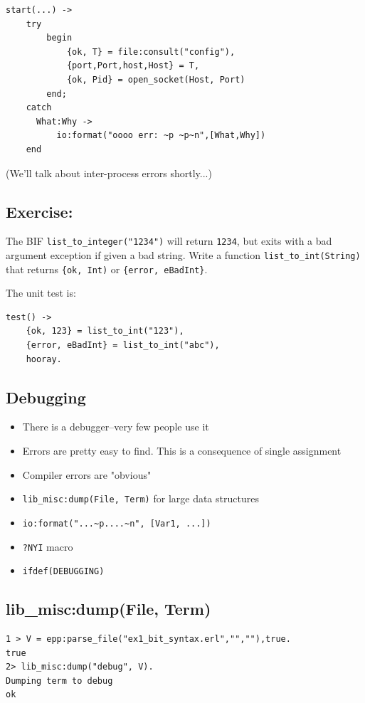 \documentclass[12pt]{article}
\begin{document}
\begin{verbatim}
start(...) ->
    try
        begin
            {ok, T} = file:consult("config"),
            {port,Port,host,Host} = T,
            {ok, Pid} = open_socket(Host, Port)
        end;
    catch
      What:Why ->
          io:format("oooo err: ~p ~p~n",[What,Why])
    end
\end{verbatim}

(We'll talk about inter-process errors shortly...)

\subsection{Exercise:}

The BIF \verb+list_to_integer("1234")+ will return \verb+1234+, but
exits with a bad argument exception if given a bad string. Write a
function \verb+list_to_int(String)+ that returns \verb+{ok, Int)+ or
  \verb+{error, eBadInt}+.

The unit test is:

\begin{verbatim}
test() ->
    {ok, 123} = list_to_int("123"),
    {error, eBadInt} = list_to_int("abc"),
    hooray.
\end{verbatim}

\subsection{Debugging}

\begin{itemize}
\item There is a debugger--very few people use it
\item Errors are pretty easy to find. This is a
consequence of single assignment
\item Compiler errors are "obvious"
\item \verb+lib_misc:dump(File, Term)+ for large data structures
\item \verb+io:format("...~p....~n", [Var1, ...])+
\item \verb+?NYI+ macro
\item \verb+ifdef(DEBUGGING)+
\end{itemize}

\subsection{lib\_misc:dump(File, Term)}


\begin{verbatim} 
1 > V = epp:parse_file("ex1_bit_syntax.erl","",""),true.
true
2> lib_misc:dump("debug", V).
Dumping term to debug
ok
\end{verbatim}
\end{document}
